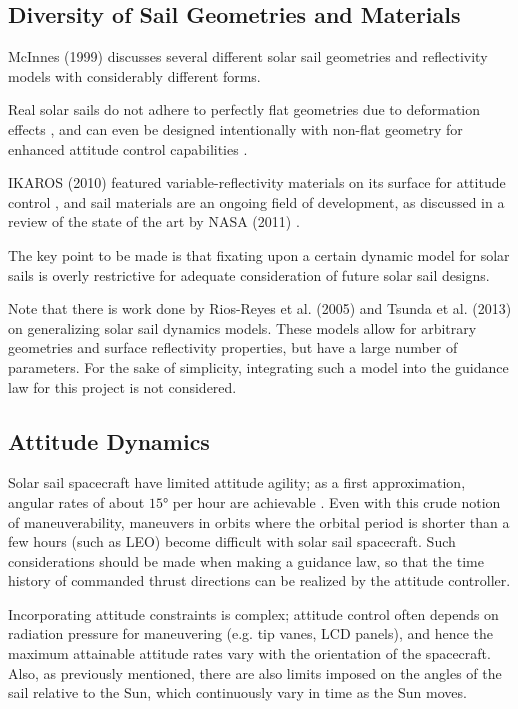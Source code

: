 \subsection{Diversity of Sail Geometries and Materials}
McInnes (1999) \cite{mcinnes} discusses several different solar sail geometries and reflectivity models with considerably different forms.

Real solar sails do not adhere to perfectly flat geometries due to deformation effects \cite{sakamoto2006effect}, and can even be designed intentionally with non-flat geometry for enhanced attitude control capabilities \cite{felicetti2016attitude}.

IKAROS (2010) featured variable-reflectivity materials on its surface for attitude control \cite{tsuda2013achievement}, and sail materials are an ongoing field of development, as discussed in a review of the state of the art by NASA (2011) \cite{johnson2011status}.

The key point to be made is that fixating upon a certain dynamic model for solar sails is overly restrictive for adequate consideration of future solar sail designs.

Note that there is work done by Rios-Reyes et al. (2005) \cite{rios2005generalized} and Tsunda et al. (2013) \cite{tsuda2013generalized} on generalizing solar sail dynamics models. These models allow for arbitrary geometries and surface reflectivity properties, but have a large number of parameters. For the sake of simplicity, integrating such a model into the guidance law for this project is not considered.

\subsection{Attitude Dynamics}
Solar sail spacecraft have limited attitude agility; as a first approximation, angular rates of about \(\ang{15}\) per hour are achievable \cite{choi2015structural}. Even with this crude notion of maneuverability, maneuvers in orbits where the orbital period is shorter than a few hours (such as LEO) become difficult with solar sail spacecraft. Such considerations should be made when making a guidance law, so that the time history of commanded thrust directions can be realized by the attitude controller.

Incorporating attitude constraints is complex; attitude control often depends on radiation pressure for maneuvering (e.g. tip vanes, LCD panels), and hence the maximum attainable attitude rates vary with the orientation of the spacecraft. Also, as previously mentioned, there are also limits imposed on the angles of the sail relative to the Sun, which continuously vary in time as the Sun moves.

